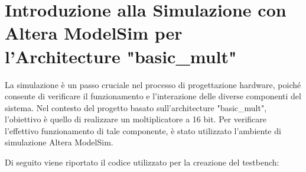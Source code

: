 \documentclass[titlepage]{report}
\begin{document}
	\section*{Introduzione alla Simulazione con Altera ModelSim per l'Architecture "basic\_mult"}
	\label{sec:intro_sim_modelsim}			
		La simulazione è un passo cruciale nel processo di progettazione hardware, poiché consente di verificare il funzionamento e l'interazione delle diverse componenti del sistema. Nel contesto del progetto basato sull'architecture "basic\_mult", l'obiettivo è quello di realizzare un moltiplicatore a 16 bit. Per verificare l'effettivo funzionamento di tale componente, è stato utilizzato l'ambiente di simulazione Altera ModelSim. \par

		Di seguito viene riportato il codice utilizzato per la creazione del testbench:
		
\end{document}
